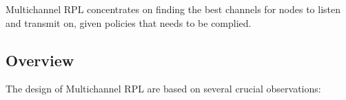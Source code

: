 
Multichannel RPL concentrates on finding the best channels for nodes to listen and transmit on, given policies that needs to be complied. 

\subsection{Overview}


The design of Multichannel RPL are based on several crucial observations:

